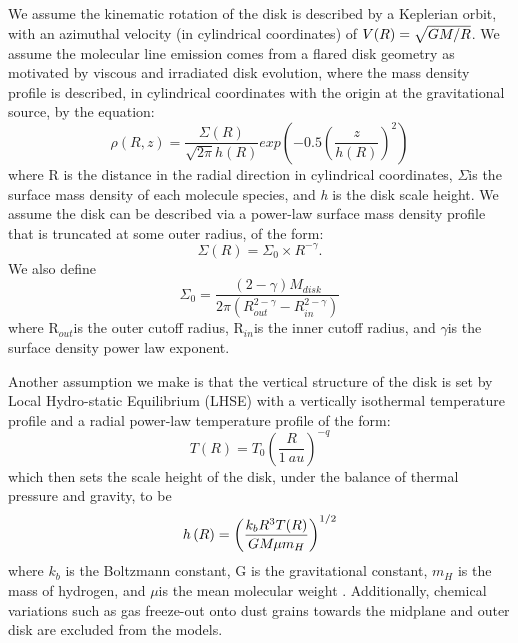 
We assume the kinematic rotation of the disk is described by a Keplerian orbit, with an azimuthal velocity (in cylindrical coordinates) of $V(R) = \sqrt{GM_{\*}/R}$. We assume the molecular line emission comes from a flared disk geometry as motivated by viscous and irradiated disk evolution, where the mass density profile is described, in cylindrical coordinates with the origin at the gravitational source, by the equation:
\begin{equation}
\rho\left(R, z\right) = \frac{\Sigma(R)}{\sqrt{2\pi}h(R)}exp\left(-0.5\left(\frac{z}{h(R)}\right)^2\right)
\end{equation}
where R is the distance in the radial direction in cylindrical coordinates, $\Sigma$\space is the surface mass density of each molecule species,  and \textit{h} is the disk scale height. We assume the disk can be described via a power-law surface mass density profile that is truncated at some outer radius, of the form:
\begin{equation}
\Sigma\left(R\right) = \Sigma_{0}\times{R}^{-\gamma}.
\end{equation}
We also define
\begin{equation}
\Sigma_{0} = \frac{(2-\gamma)M_{disk}}{2\pi\left(R_{out}^{2-\gamma} - R_{in}^{2-\gamma}\right)}
\end{equation}
where R$_{out}$\space is the outer cutoff radius, R$_{in}$\space is the inner cutoff radius, and $\gamma$\space is the surface density power law exponent.

Another assumption we make is that the vertical structure of the disk is set by Local Hydro-static Equilibrium (LHSE) with a vertically isothermal temperature profile and a radial power-law temperature profile of the form:
\begin{equation}
T\left(R\right) = T_{0}\left(\frac{R}{1~au}\right)^{-q}
\end{equation}
which then sets the scale height of the disk, under the balance of thermal pressure and gravity, to be 
\begin{equation}
h\left(R\right) = \left(\frac{k_{b}R^{3}T(R)}{GM_{\*}\mu m_{H}}\right)^{1/2}
\end{equation}
where $k_{b}$ is the Boltzmann constant, G is the gravitational constant, $m_{H}$ is the mass of hydrogen, and $\mu$\space is the mean molecular weight \citep[assuming classic protostellar mean molecular weight, $\mu\approx2.37$; ][]{2003ApJ...591.1220L}. Additionally, chemical variations such as gas freeze-out onto dust grains towards the midplane and outer disk are excluded from the models.

